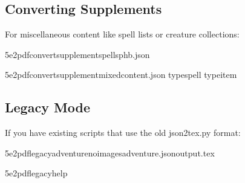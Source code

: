 \documentclass[letterpaper,10pt,english]{sphinxmanual}
\begin{document}
\subsection{Converting Supplements}
\label{\detokenize{user-guide/quickstart:converting-supplements}}
\sphinxAtStartPar
For miscellaneous content like spell lists or creature collections:

\begin{sphinxVerbatim}[commandchars=\\\{\}]
5e2pdfconvertsupplementspells\PYGZhy{}phb.json

5e2pdfconvertsupplementmixed\PYGZhy{}content.json
\PYGZhy{}\PYGZhy{}typespell
\PYGZhy{}\PYGZhy{}typeitem
\end{sphinxVerbatim}


\subsection{Legacy Mode}
\label{\detokenize{user-guide/quickstart:legacy-mode}}
\sphinxAtStartPar
If you have existing scripts that use the old json2tex.py format:

\begin{sphinxVerbatim}[commandchars=\\\{\}]
5e2pdflegacy\PYGZhy{}\PYGZhy{}adventure\PYGZhy{}\PYGZhy{}no\PYGZhy{}imagesadventure.json\PYGZgt{}output.tex

5e2pdflegacy\PYGZhy{}\PYGZhy{}help
\end{sphinxVerbatim}
\end{document}
